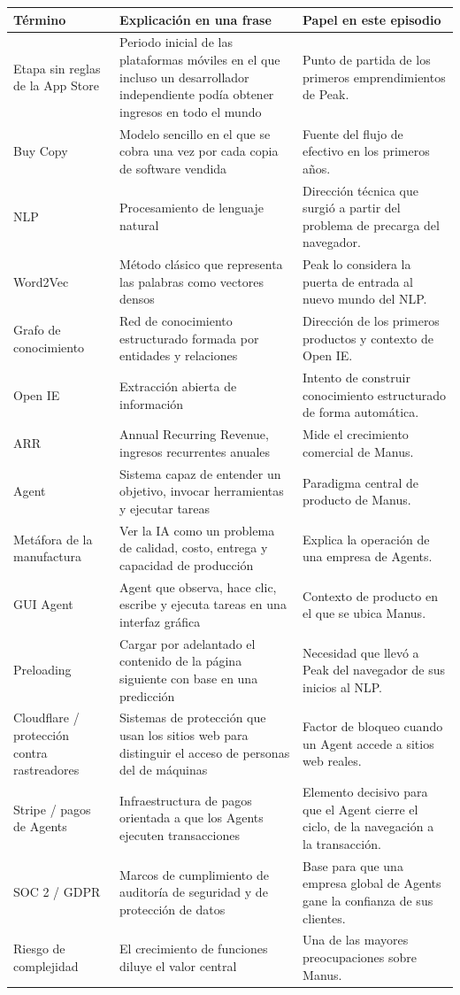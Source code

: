 \documentclass[a4paper]{article}
\begin{document}
\begin{longtable}{p{}p{}p{}}
\toprule
Término & Explicación en una frase & Papel en este episodio \\
\midrule
Etapa sin reglas de la App Store & Periodo inicial de las plataformas móviles en el que incluso un desarrollador independiente podía obtener ingresos en todo el mundo & Punto de partida de los primeros emprendimientos de Peak. \\
Buy Copy & Modelo sencillo en el que se cobra una vez por cada copia de software vendida & Fuente del flujo de efectivo en los primeros años. \\
NLP & Procesamiento de lenguaje natural & Dirección técnica que surgió a partir del problema de precarga del navegador. \\
Word2Vec & Método clásico que representa las palabras como vectores densos & Peak lo considera la puerta de entrada al nuevo mundo del NLP. \\
Grafo de conocimiento & Red de conocimiento estructurado formada por entidades y relaciones & Dirección de los primeros productos y contexto de Open IE. \\
Open IE & Extracción abierta de información & Intento de construir conocimiento estructurado de forma automática. \\
ARR & Annual Recurring Revenue, ingresos recurrentes anuales & Mide el crecimiento comercial de Manus. \\
Agent & Sistema capaz de entender un objetivo, invocar herramientas y ejecutar tareas & Paradigma central de producto de Manus. \\
Metáfora de la manufactura & Ver la IA como un problema de calidad, costo, entrega y capacidad de producción & Explica la operación de una empresa de Agents. \\
GUI Agent & Agent que observa, hace clic, escribe y ejecuta tareas en una interfaz gráfica & Contexto de producto en el que se ubica Manus. \\
Preloading & Cargar por adelantado el contenido de la página siguiente con base en una predicción & Necesidad que llevó a Peak del navegador de sus inicios al NLP. \\
Cloudflare / protección contra rastreadores & Sistemas de protección que usan los sitios web para distinguir el acceso de personas del de máquinas & Factor de bloqueo cuando un Agent accede a sitios web reales. \\
Stripe / pagos de Agents & Infraestructura de pagos orientada a que los Agents ejecuten transacciones & Elemento decisivo para que el Agent cierre el ciclo, de la navegación a la transacción. \\
SOC 2 / GDPR & Marcos de cumplimiento de auditoría de seguridad y de protección de datos & Base para que una empresa global de Agents gane la confianza de sus clientes. \\
Riesgo de complejidad & El crecimiento de funciones diluye el valor central & Una de las mayores preocupaciones sobre Manus. \\
\bottomrule
\end{longtable}
\end{document}

